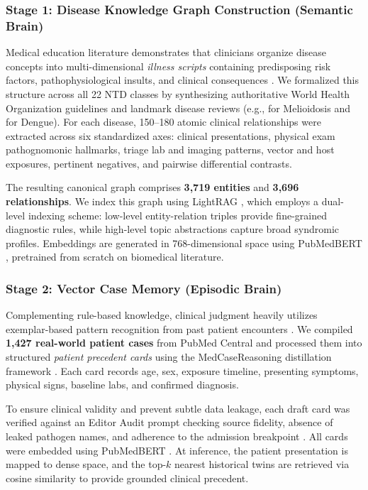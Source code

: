 \documentclass{article}
\begin{document}
\subsubsection{Stage 1: Disease Knowledge Graph Construction (Semantic Brain)}

Medical education literature demonstrates that clinicians organize disease concepts into multi-dimensional \emph{illness scripts} containing predisposing risk factors, pathophysiological insults, and clinical consequences \citep{bowen2006educational}. We formalized this structure across all 22 NTD classes by synthesizing authoritative World Health Organization guidelines \citep{who2020road} and landmark disease reviews (e.g., \citet{cheng2005melioidosis} for Melioidosis and \citet{muller2017dengue} for Dengue). For each disease, 150--180 atomic clinical relationships were extracted across six standardized axes: clinical presentations, physical exam pathognomonic hallmarks, triage lab and imaging patterns, vector and host exposures, pertinent negatives, and pairwise differential contrasts.

The resulting canonical graph comprises \textbf{3,719 entities} and \textbf{3,696 relationships}. We index this graph using LightRAG \citep{gao2023lightrag}, which employs a dual-level indexing scheme: low-level entity-relation triples provide fine-grained diagnostic rules, while high-level topic abstractions capture broad syndromic profiles. Embeddings are generated in 768-dimensional space using PubMedBERT \citep{gu2021pubmedbert}, pretrained from scratch on biomedical literature.

\subsubsection{Stage 2: Vector Case Memory (Episodic Brain)}

Complementing rule-based knowledge, clinical judgment heavily utilizes exemplar-based pattern recognition from past patient encounters \citep{schmidt1990cognitive,croskerry2009universal}. We compiled \textbf{1,427 real-world patient cases} from PubMed Central and processed them into structured \emph{patient precedent cards} using the MedCaseReasoning distillation framework \citep{wu2025medcasereasoning}. Each card records age, sex, exposure timeline, presenting symptoms, physical signs, baseline labs, and confirmed diagnosis. 

To ensure clinical validity and prevent subtle data leakage, each draft card was verified against an Editor Audit prompt checking source fidelity, absence of leaked pathogen names, and adherence to the admission breakpoint \citep{wu2025medcasereasoning}. All cards were embedded using PubMedBERT \citep{gu2021pubmedbert}. At inference, the patient presentation is mapped to dense space, and the top-$k$ nearest historical twins are retrieved via cosine similarity to provide grounded clinical precedent.
\end{document}
